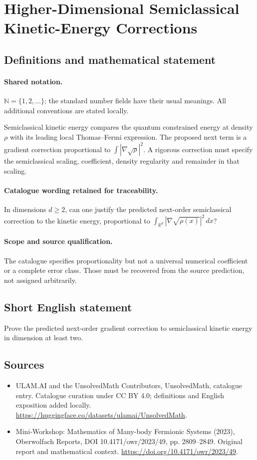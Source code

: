 \documentclass[11pt]{article}
\begin{document}
\section{Higher-Dimensional Semiclassical Kinetic-Energy Corrections}\label{statement}

\subsection{Definitions and mathematical statement}

\paragraph{Shared notation.}$\mathbb N=\{1,2,\ldots\}$; the standard number fields have their usual meanings. All additional conventions are stated locally.


Semiclassical kinetic energy compares the quantum constrained energy at density $\rho$ with its leading local Thomas--Fermi expression. The proposed next term is a gradient correction proportional to $\int|\nabla\sqrt\rho|^2$. A rigorous correction must specify the semiclassical scaling, coefficient, density regularity and remainder in that scaling.

\paragraph{Catalogue wording retained for traceability.}
In dimensions $d\geq2$, can one justify the predicted next-order semiclassical correction to the kinetic energy, proportional to $\int_{\mathbb{R}^d}|\nabla\sqrt{\rho(x)}|^2\,dx$?

\paragraph{Scope and source qualification.}The catalogue specifies proportionality but not a universal numerical coefficient or a complete error class. Those must be recovered from the source prediction, not assigned arbitrarily.
\subsection{Short English statement}
Prove the predicted next-order gradient correction to semiclassical kinetic energy in dimension at least two.
\subsection{Sources}
\begin{itemize}
\item[\hypertarget{source:statement:1}{S1}] ULAM.AI and the UnsolvedMath Contributors, UnsolvedMath, catalogue entry. Catalogue curation under CC BY 4.0; definitions and English exposition added locally.
\url{https://huggingface.co/datasets/ulamai/UnsolvedMath}.
\item[\hypertarget{source:statement:2}{S2}] Mini-Workshop: Mathematics of Many-body Fermionic Systems (2023), Oberwolfach Reports, DOI 10.4171/owr/2023/49, pp. 2809--2849. Original report and mathematical context.
\url{https://doi.org/10.4171/owr/2023/49}.
\end{itemize}
\label{end:statement}
\end{document}
